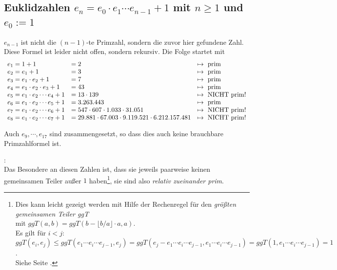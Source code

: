 \begin{refsegment}
\subsection[Euklidzahlen \texorpdfstring{$e_n = e_0 \cdot e_1 \cdots e_{n-1} + 1$}{e\_n = e\_0 ... e\_1 ... e\_n-1 + 1}]
              {Euklidzahlen $e_n = e_0 \cdot e_1 \cdots e_{n-1} + 1$
	       mit $ n \geq 1 $ und $ e_0 := 1 $}
    $e_{n-1}$ ist nicht die $(n-1)$-te Primzahl, sondern die zuvor hier
    gefundene Zahl.
    Diese Formel ist leider nicht offen, sondern rekursiv.
    Die Folge startet mit
$$
\begin{array}{lll}
e_1 = 1 + 1 &   = 2 &   \mapsto {\rm ~prim} \\
e_2 = e_1 + 1   &   = 3 &   \mapsto {\rm ~prim} \\
e_3 = e_1 \cdot e_2 + 1 &   = 7 &   \mapsto {\rm ~prim} \\
e_4 = e_1 \cdot e_2 \cdot e_3 + 1 & = 43 &  \mapsto {\rm ~prim} \\
e_5 = e_1 \cdot e_2 \cdots e_4 + 1 &    = 13 \cdot 139 &    \mapsto {\rm ~NICHT~prim} ! \\
e_6 = e_1 \cdot e_2 \cdots e_5 + 1 &    = 3.263.443 &   \mapsto {\rm ~prim} \\
e_7 = e_1 \cdot e_2 \cdots e_6 + 1 &    = 547 \cdot 607 \cdot 1.033 \cdot 31.051 & \mapsto {\rm ~NICHT~prim} ! \\
e_8 = e_1 \cdot e_2 \cdots e_7 + 1 &    = 29.881\cdot 67.003 \cdot 9.119.521 \cdot 6.212.157.481 & \mapsto {\rm ~NICHT~prim} !
\end{array}
$$

\noindent Auch $e_9, \cdots, e_{17}$ sind zusammengesetzt, so dass dies auch
keine brauchbare Primzahlformel ist.

\begin{remark}{:}\\
Das Besondere an diesen Zahlen ist, dass sie jeweils paarweise
keinen gemeinsamen Teiler außer $1$ haben\footnote{%
Dies kann leicht gezeigt werden mit Hilfe der Rechenregel für den
{\em größten gemeinsamen Teiler ggT} \\
mit $ggT(a,b) = ggT(b-\lfloor b/a\rfloor \cdot a, a)$.\\
Es gilt für $i<j$: \\
$ggT(e_i,e_j) \le ggT(e_1 \cdots e_i \cdots e_{j-1}, e_j) = ggT(e_j - e_1 \cdots e_i \cdots e_{j-1}, e_1 \cdots e_i \cdots e_{j-1})
= ggT(1, e_1 \cdots e_i \cdots e_{j-1}) = 1$.\\
Siehe Seite \pageref{nt:NumberTheory_Appendix_GCD}.  %
}, sie sind also%
 {\em relativ zueinander prim}.
\end{remark}


\end{refsegment}
